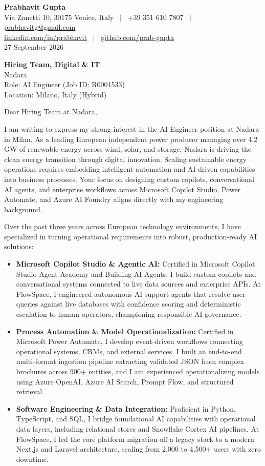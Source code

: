 \documentclass[10.5pt,a4paper]{article}
\begin{document}
\textbf{\large Prabhavit Gupta}\\
Via Zanetti 10, 30175 Venice, Italy ~$\vert$~ +39 351 610 7807 ~$\vert$~ \href{mailto:prabhavitg@gmail.com}{prabhavitg@gmail.com}\\
\href{https://www.linkedin.com/in/prabhavit/}{linkedin.com/in/prabhavit} ~$\vert$~ \href{https://github.com/prab-gupta}{github.com/prab-gupta}\\
27 September 2026

\textbf{Hiring Team, Digital \& IT}\\
Nadara\\
Role: AI Engineer (Job ID: R0001533)\\
Location: Milano, Italy (Hybrid)

Dear Hiring Team at Nadara,

I am writing to express my strong interest in the AI Engineer position at Nadara in Milan. As a leading European independent power producer managing over 4.2 GW of renewable energy across wind, solar, and storage, Nadara is driving the clean energy transition through digital innovation. Scaling sustainable energy operations requires embedding intelligent automation and AI-driven capabilities into business processes. Your focus on designing custom copilots, conversational AI agents, and enterprise workflows across Microsoft Copilot Studio, Power Automate, and Azure AI Foundry aligns directly with my engineering background.

Over the past three years across European technology environments, I have specialized in turning operational requirements into robust, production-ready AI solutions:

\begin{itemize}
  \setlength{\itemsep}{1pt}
  \setlength{\parskip}{0pt}
  \item \textbf{Microsoft Copilot Studio \& Agentic AI:} Certified in Microsoft Copilot Studio Agent Academy and Building AI Agents, I build custom copilots and conversational systems connected to live data sources and enterprise APIs. At FlowSpace, I engineered autonomous AI support agents that resolve user queries against live databases with confidence scoring and deterministic escalation to human operators, championing responsible AI governance.
  \item \textbf{Process Automation \& Model Operationalization:} Certified in Microsoft Power Automate, I develop event-driven workflows connecting operational systems, CRMs, and external services. I built an end-to-end multi-format ingestion pipeline extracting validated JSON from complex brochures across 900+ entities, and I am experienced operationalizing models using Azure OpenAI, Azure AI Search, Prompt Flow, and structured retrieval.
  \item \textbf{Software Engineering \& Data Integration:} Proficient in Python, TypeScript, and SQL, I bridge foundational AI capabilities with operational data layers, including relational stores and Snowflake Cortex AI pipelines. At FlowSpace, I led the core platform migration off a legacy stack to a modern Next.js and Laravel architecture, scaling from 2,000 to 4,500+ users with zero downtime.
\end{itemize}
\end{document}
